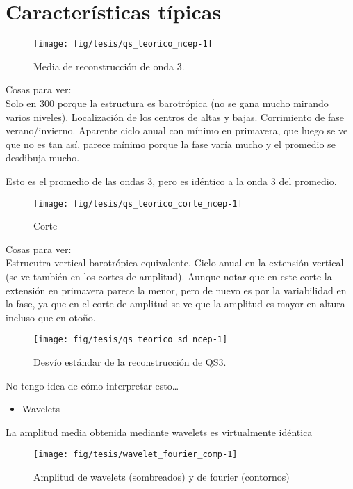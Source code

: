\documentclass[spanish,a4paper]{book}
\providecommand{\tightlist}{%
  \setlength{\itemsep}{0pt}\setlength{\parskip}{0pt}}
\begin{document}
\section{Características típicas}\label{caracteristicas-tipicas}

\begin{figure*}
\texttt{[image: fig/tesis/qs\_teorico\_ncep-1]} \caption{Media de reconstrucción de onda 3.}\label{fig:qs_teorico_ncep}
\end{figure*}

Cosas para ver:\\
Solo en 300 porque la estructura es barotrópica (no se gana mucho
mirando varios niveles). Localización de los centros de altas y bajas.
Corrimiento de fase verano/invierno. Aparente ciclo anual con mínimo en
primavera, que luego se ve que no es tan así, parece mínimo porque la
fase varía mucho y el promedio se desdibuja mucho.

Esto es el promedio de las ondas 3, pero es idéntico a la onda 3 del
promedio.

\begin{figure*}
\texttt{[image: fig/tesis/qs\_teorico\_corte\_ncep-1]} \caption{Corte}\label{fig:qs_teorico_corte_ncep}
\end{figure*}

Cosas para ver:\\
Estrucutra vertical barotrópica equivalente. Ciclo anual en la extensión
vertical (se ve también en los cortes de amplitud). Aunque notar que en
este corte la extensión en primavera parece la menor, pero de nuevo es
por la variabilidad en la fase, ya que en el corte de amplitud se ve que
la amplitud es mayor en altura incluso que en otoño.

\begin{figure*}
\texttt{[image: fig/tesis/qs\_teorico\_sd\_ncep-1]} \caption{Desvío estándar de la reconstrucción de QS3.}\label{fig:qs_teorico_sd_ncep}
\end{figure*}

No tengo idea de cómo interpretar esto\ldots{}

\begin{itemize}
\tightlist
\item
  Wavelets
\end{itemize}

La amplitud media obtenida mediante wavelets es virtualmente idéntica

\begin{figure}

{\centering \texttt{[image: fig/tesis/wavelet\_fourier\_comp-1]} 

}

\caption{Amplitud de wavelets (sombreados) y de fourier (contornos)}\label{fig:wavelet_fourier_comp}
\end{figure}
\end{document}

